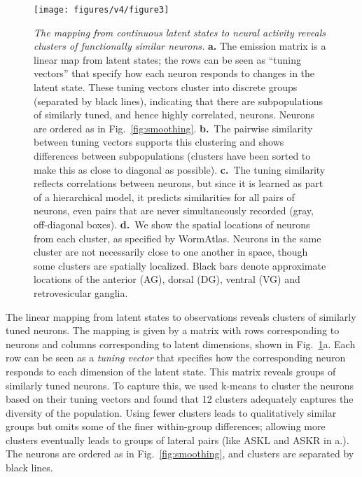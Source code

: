 \documentclass[11pt]{article}
\begin{document}
\begin{figure}[t!]
\centering
\texttt{[image: figures/v4/figure3]} 
\caption{ \textit{The mapping from continuous latent states to neural
    activity reveals clusters of functionally similar neurons.}
  \textbf{a.} The emission matrix is a linear map from latent states;
  the rows can be seen as ``tuning vectors'' that specify how each
  neuron responds to changes in the latent state.  These tuning
  vectors cluster into discrete groups (separated by black lines),
  indicating that there are subpopulations of similarly tuned, and
  hence highly correlated, neurons. Neurons are ordered as in
  Fig.~\ref{fig:smoothing}. \textbf{b.}~The pairwise similarity between
  tuning vectors supports this clustering and shows differences
  between subpopulations (clusters have been sorted to make this as
  close to diagonal as possible).  \textbf{c.}~The tuning similarity
  reflects correlations between neurons, but since it is learned as
  part of a hierarchical model, it predicts similarities for all pairs
  of neurons, even pairs that are never simultaneously recorded (gray,
  off-diagonal boxes).  \textbf{d.}~We show the spatial locations of
  neurons from each cluster, as specified by WormAtlas.  Neurons in
  the same cluster are not necessarily close to one another in space,
  though some clusters are spatially localized. Black bars denote
  approximate locations of the anterior (AG), dorsal (DG), ventral
  (VG) and retrovesicular ganglia.}
\label{fig:clustering}
\end{figure}


The linear mapping from latent states to observations reveals clusters
of similarly tuned neurons.  The mapping is given by a matrix with
rows corresponding to neurons and columns corresponding to latent
dimensions, shown in Fig.~\ref{fig:clustering}a.  Each row can be seen
as a \emph{tuning vector} that specifies how the corresponding neuron
responds to each dimension of the latent state.  This matrix reveals
groups of similarly tuned neurons. To capture this, we used k-means to
cluster the neurons based on their tuning vectors and found that 12
clusters adequately captures the diversity of the population.  Using
fewer clusters leads to qualitatively similar groups but omits some of
the finer within-group differences; allowing more clusters eventually
leads to groups of lateral pairs (like \textsf{ASKL} and \textsf{ASKR}
in a.).  The neurons are ordered as in Fig.~\ref{fig:smoothing}, and
clusters are separated by black lines.
\end{document}
